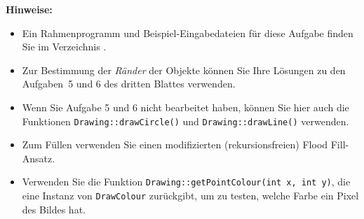 \textbf{Hinweise:}
\begin{itemize}
  \item Ein Rahmenprogramm und Beispiel-Eingabedateien für diese Aufgabe 
        finden Sie im Verzeichnis .
  \item Zur Bestimmung der {\em Ränder\/} der Objekte können Sie Ihre 
        Lösungen zu den Aufgaben~5 und 6 des dritten Blattes verwenden.
  \item Wenn Sie Aufgabe 5 und 6 nicht bearbeitet haben, können Sie hier 
        auch die Funktionen \texttt{Drawing::drawCircle()} und 
        \texttt{Drawing::drawLine()} verwenden.
  \item Zum Füllen verwenden Sie einen modifizierten (rekursionsfreien) 
        Flood Fill-Ansatz.
  \item Verwenden Sie die Funktion 
        \texttt{Drawing::getPointColour(int x, int y)}, die eine Instanz
        von \texttt{DrawColour} zurückgibt, um zu testen, welche Farbe 
        ein Pixel des Bildes hat.
\end{itemize}

